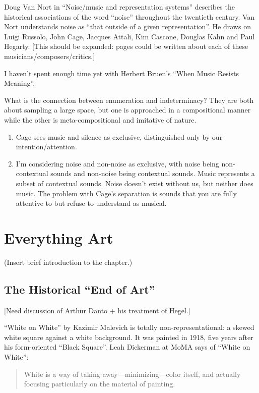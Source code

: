 \documentclass{thesis}
\begin{document}
	Doug Van Nort in ``Noise/music and representation systems''\cite{Vannort06} describes the historical associations of the word ``noise'' throughout the twentieth century. Van Nort understands noise as ``that outside of a given representation''. He draws on Luigi Russolo\cite{Russolo04}, John Cage\cite{Cage61}, Jacques Attali\cite{Attali85}, Kim Cascone\cite{Cascone00}, Douglas Kahn\cite{Kahn01} and Paul Hegarty\cite{Hegarty02}. [This should be expanded: pages could be written about each of these musicians/composers/critics.]

	I haven't spent enough time yet with Herbert Bruen's ``When Music Resists Meaning''.\cite{Bruen04}
	
	What is the connection between enumeration and indeterminacy? They are both about sampling a large space, but one is approached in a compositional manner while the other is meta-compositional and imitative of nature.
	
\begin{enumerate}
	\item Cage sees music and silence as exclusive, distinguished only by our intention/attention.
	\item I'm considering noise and non-noise as exclusive, with noise being non-contextual sounds and non-noise being contextual sounds. Music represents a subset of contextual sounds. Noise doesn't exist without us, but neither does music. The problem with Cage's separation is sounds that you are fully attentive to but refuse to understand as musical.
\end{enumerate}
	
\chapter{Everything Art}	
(Insert brief introduction to the chapter.)

\section{The Historical ``End of Art''}	
	[Need discussion of Arthur Danto + his treatment of Hegel.]

	``White on White'' by Kazimir Malevich is totally non-representational: a skewed white square against a white background. It was painted in 1918, five years after his form-oriented ``Black Square''. Leah Dickerman at MoMA says of ``White on White''\cite{moma_kazimir_2006}:
	
	\begin{quote}
	White is a way of taking away---minimizing---color itself, and actually focusing particularly on the material of painting.
	\end{quote}
	
\end{document}
